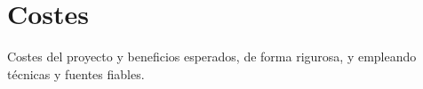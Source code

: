\section{Costes}
\label{sec:costs}

\begin{shaded}
Costes del proyecto y beneficios esperados, de forma rigurosa, y empleando técnicas y fuentes fiables.
\end{shaded}